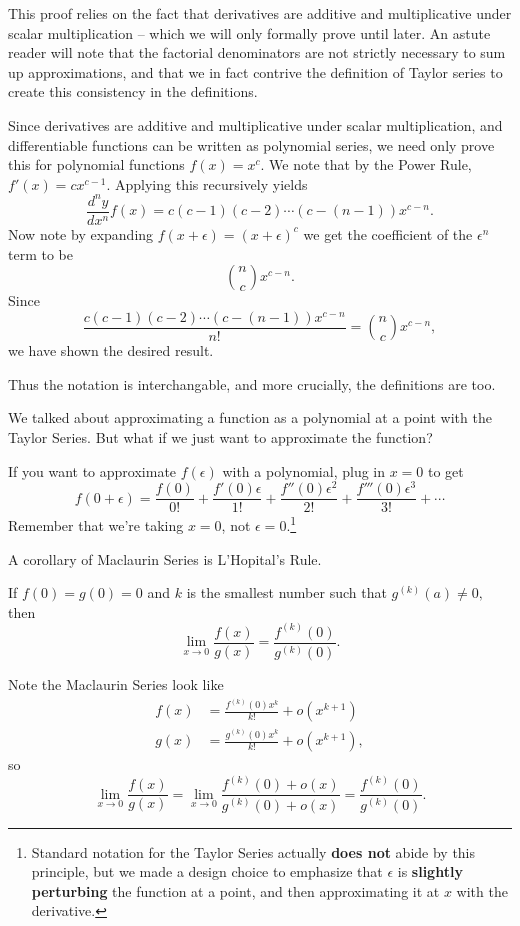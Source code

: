 \documentclass[blue,onecol]{shooting}
\begin{document}
This proof relies on the fact that derivatives are additive and multiplicative under scalar multiplication -- which we will only formally prove until later. An astute reader will note that the factorial denominators are not strictly necessary to sum up approximations, and that we in fact contrive the definition of Taylor series to create this consistency in the definitions.

\begin{pro}
Since derivatives are additive and multiplicative under scalar multiplication, and differentiable functions can be written as polynomial series, we need only prove this for polynomial functions $f(x)=x^c.$ We note that by the Power Rule, $f'(x)=cx^{c-1}.$ Applying this recursively yields
\[\frac{d^ny}{dx^n}f(x)=c(c-1)(c-2)\cdots(c-(n-1))x^{c-n}.\]
Now note by expanding $f(x+\epsilon)=(x+\epsilon)^c$ we get the coefficient of the $\epsilon^n$ term to be
\[\binom{n}{c}x^{c-n}.\]
Since
\[\frac{c(c-1)(c-2)\cdots(c-(n-1))x^{c-n}}{n!}=\binom{n}{c}x^{c-n},\]
we have shown the desired result.
\end{pro}

Thus the notation is interchangable, and more crucially, the definitions are too.

We talked about approximating a function as a polynomial at a point with the Taylor Series. But what if we just want to approximate the function?

\begin{defi}
If you want to approximate $f(\epsilon)$ with a polynomial, plug in $x=0$ to get
\[f(0+\epsilon)=\frac{f(0)}{0!}+\frac{f'(0)\epsilon}{1!}+\frac{f''(0)\epsilon^2}{2!}+\frac{f'''(0)\epsilon^3}{3!}+\cdots\]
Remember that we're taking $x=0$, not $\epsilon=0.$\footnote{Standard notation for the Taylor Series actually \textbf{does not} abide by this principle, but we made a design choice to emphasize that $\epsilon$ is \textbf{slightly perturbing} the function at a point, and then approximating it at $x$ with the derivative.}
\end{defi}

A corollary of Maclaurin Series is L'Hopital's Rule.

\begin{theo}
If $f(0)=g(0)=0$ and $k$ is the smallest number such that $g^{(k)}(a)\neq 0,$ then
\[\lim_{x\to 0}\frac{f(x)}{g(x)}=\frac{f^{(k)}(0)}{g^{(k)}(0)}.\]
\end{theo}

\begin{pro}
Note the Maclaurin Series look like
\begin{align*}
f(x)&=\frac{f^{(k)}(0)x^k}{k!}+o(x^{k+1})\\
g(x)&=\frac{g^{(k)}(0)x^k}{k!}+o(x^{k+1}),
\end{align*}
so
\[\lim_{x\to 0}\frac{f(x)}{g(x)}=\lim_{x\to 0}\frac{f^{(k)}(0)+o(x)}{g^{(k)}(0)+o(x)}=\frac{f^{(k)}(0)}{g^{(k)}(0)}.\]
\end{pro}
\end{document}

